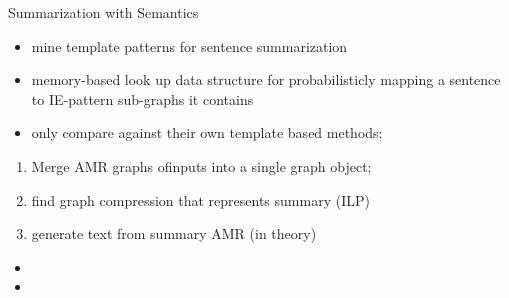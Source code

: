 \documentclass[xcolor={table}]{beamer}
\begin{document}
\begin{frame}{Summarization with Semantics}

    \textbf{\cite{pighin2014modelling}} 
        \begin{itemize}
                \small
            \item mine template patterns for sentence 
        summarization
            \item memory-based look up data structure for 
                probabilisticly mapping a 
                sentence to IE-pattern sub-graphs it contains
            \item only compare against their own template based methods;\\
        \end{itemize}

        \textbf{\cite{liu2015toward}} 
        \begin{enumerate}
                \small
            \item Merge AMR graphs ofinputs into a single graph object; 
            \item find graph compression that represents summary (ILP)
            \item generate text from summary AMR (in theory)
        \end{enumerate}
    \begin{itemize}
            \small
        \item {}
\item {}
    \end{itemize}
\end{frame}
\end{document}

